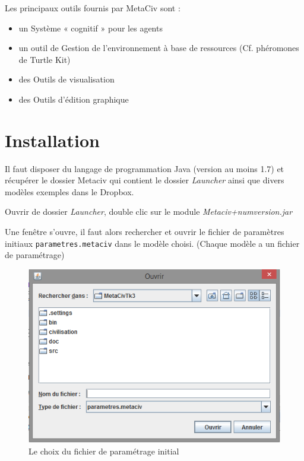 \documentclass[a4paper,oneside,12 pt]{article}
\begin{document}
Les principaux outils fournis par MetaCiv sont :
\begin{itemize}
\item un Système « cognitif » pour les agents
\item un outil de Gestion de l’environnement à base de ressources (Cf. phéromones de Turtle Kit)
\item des Outils de visualisation
\item des Outils d’édition graphique
\end{itemize}

\section{Installation}

Il faut disposer du langage de programmation Java (version au moins 1.7) et récupérer le dossier Metaciv qui contient le dossier \textit{Launcher} ainsi que divers modèles exemples dans le Dropbox.

Ouvrir de dossier \textit{Launcher}, double clic sur le module \textit{Metaciv+numversion.jar}


Une fenêtre s'ouvre, il faut alors rechercher et ouvrir le fichier de paramètres initiaux  \texttt{parametres.metaciv} dans le modèle choisi. (Chaque modèle a un fichier de paramétrage)



\begin{figure}[hbtp]
\begin{center}
 \includegraphics [scale=0.4] {ecran1.png}
\end{center}
 \caption{Le choix du fichier de paramétrage initial}
\end{figure}
\end{document}
